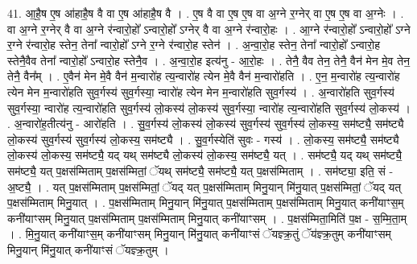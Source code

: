 \documentclass[17pt]{extarticle}
\begin{document}
41. आ॒है॒ष ए॒ष आ॑हाहै॒ष वै वा ए॒ष आ॑हाहै॒ष वै । . ए॒ष वै वा ए॒ष ए॒ष वा अ॒ग्ने र॒ग्नेर् वा ए॒ष ए॒ष वा अ॒ग्नेः । . वा अ॒ग्ने र॒ग्नेर् वै वा अ॒ग्ने र॑न्वारो॒हो᳚ ऽन्वारो॒हो᳚ ऽग्नेर् वै वा अ॒ग्ने र॑न्वारो॒हः । . आ॒ग्ने र॑न्वारो॒हो᳚ ऽन्वारो॒हो᳚ ऽग्ने र॒ग्ने र॑न्वारो॒ह स्तेन॒ तेना᳚ न्वारो॒हो᳚ ऽग्ने र॒ग्ने र॑न्वारो॒ह स्तेन॑ । . अ॒न्वा॒रो॒ह स्तेन॒ तेना᳚ न्वारो॒हो᳚ ऽन्वारो॒ह स्तेनै॒वैव तेना᳚ न्वारो॒हो᳚ ऽन्वारो॒ह स्तेनै॒व । . अ॒न्वा॒रो॒ह इत्य॑नु - आ॒रो॒हः । . तेनै॒ वैव तेन॒ तेनै॒ वैन॑ मेन मे॒व तेन॒ तेनै॒ वैन᳚म् । . ए॒वैन॑ मेन मे॒वै वैन॑ म॒न्वारो॑ह त्य॒न्वारो॑ह त्येन मे॒वै वैन॑ म॒न्वारो॑हति । . ए॒न॒ म॒न्वारो॑ह त्य॒न्वारो॑ह त्येन मेन म॒न्वारो॑हति सुव॒र्गस्य॑ सुव॒र्गस्या॒ न्वारो॑ह त्येन मेन म॒न्वारो॑हति सुव॒र्गस्य॑ । . अ॒न्वारो॑हति सुव॒र्गस्य॑ सुव॒र्गस्या॒ न्वारो॑ह त्य॒न्वारो॑हति सुव॒र्गस्य॑ लो॒कस्य॑ लो॒कस्य॑ सुव॒र्गस्या॒ न्वारो॑ह त्य॒न्वारो॑हति सुव॒र्गस्य॑ लो॒कस्य॑ । . अ॒न्वारो॑ह॒तीत्य॑नु - आरो॑हति । . सु॒व॒र्गस्य॑ लो॒कस्य॑ लो॒कस्य॑ सुव॒र्गस्य॑ सुव॒र्गस्य॑ लो॒कस्य॒ सम॑ष्ट्यै॒ सम॑ष्ट्यै लो॒कस्य॑ सुव॒र्गस्य॑ सुव॒र्गस्य॑ लो॒कस्य॒ सम॑ष्ट्यै । . सु॒व॒र्गस्येति॑ सुवः - गस्य॑ । . लो॒कस्य॒ सम॑ष्ट्यै॒ सम॑ष्ट्यै लो॒कस्य॑ लो॒कस्य॒ सम॑ष्ट्यै॒ यद् यथ् सम॑ष्ट्यै लो॒कस्य॑ लो॒कस्य॒ सम॑ष्ट्यै॒ यत् । . सम॑ष्ट्यै॒ यद् यथ् सम॑ष्ट्यै॒ सम॑ष्ट्यै॒ यत् प॒क्षस॑म्मिताम् प॒क्षस॑म्मितां॒ ॅयथ् सम॑ष्ट्यै॒ सम॑ष्ट्यै॒ यत् प॒क्षस॑म्मिताम् । . सम॑ष्ट्या॒ इति॒ सं - अ॒ष्ट्यै॒ । . यत् प॒क्षस॑म्मिताम् प॒क्षस॑म्मितां॒ ॅयद् यत् प॒क्षस॑म्मिताम् मिनु॒यान् मि॑नु॒यात् प॒क्षस॑म्मितां॒ ॅयद् यत् प॒क्षस॑म्मिताम् मिनु॒यात् । . प॒क्षस॑म्मिताम् मिनु॒यान् मि॑नु॒यात् प॒क्षस॑म्मिताम् प॒क्षस॑म्मिताम् मिनु॒यात् कनी॑याꣳस॒म् कनी॑याꣳसम् मिनु॒यात् प॒क्षस॑म्मिताम् प॒क्षस॑म्मिताम् मिनु॒यात् कनी॑याꣳसम् । . प॒क्षस॑म्मिता॒मिति॑ प॒क्ष - स॒म्मि॒ता॒म् । . मि॒नु॒यात् कनी॑याꣳस॒म् कनी॑याꣳसम् मिनु॒यान् मि॑नु॒यात् कनी॑याꣳसं ॅयज्ञ्क्र॒तुं ॅय॑ज्ञ्क्र॒तुम् कनी॑याꣳसम् मिनु॒यान् मि॑नु॒यात् कनी॑याꣳसं ॅयज्ञ्क्र॒तुम् । \newline
\pagebreak
{}
\end{document}
